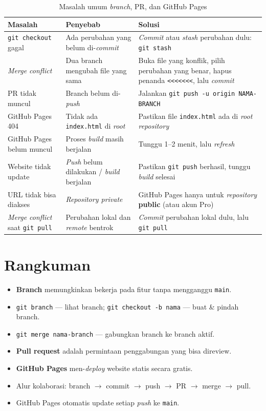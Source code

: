 \begin{table}[h!]
\centering
\caption{Masalah umum \emph{branch}, PR, dan GitHub Pages}
\label{tab:trouble-09}
\begin{tabular}{|p{3.5cm}|p{4cm}|p{5cm}|}
\hline
\textbf{Masalah} & \textbf{Penyebab} & \textbf{Solusi} \\
\hline
\texttt{git checkout} gagal & Ada perubahan yang belum di-\emph{commit} & \emph{Commit} atau \emph{stash} perubahan dulu: \texttt{git stash} \\
\hline
\emph{Merge conflict} & Dua branch mengubah file yang sama & Buka file yang konflik, pilih perubahan yang benar, hapus penanda \texttt{<<<<<<<}, lalu \emph{commit} \\
\hline
PR tidak muncul & Branch belum di-\emph{push} & Jalankan \texttt{git push -u origin NAMA-BRANCH} \\
\hline
GitHub Pages 404 & Tidak ada \texttt{index.html} di \emph{root} & Pastikan file \texttt{index.html} ada di \emph{root repository} \\
\hline
GitHub Pages belum muncul & Proses \emph{build} masih berjalan & Tunggu 1--2 menit, lalu \emph{refresh} \\
\hline
Website tidak update & \emph{Push} belum dilakukan / \emph{build} berjalan & Pastikan \texttt{git push} berhasil, tunggu \emph{build} selesai \\
\hline
URL tidak bisa diakses & \emph{Repository private} & GitHub Pages hanya untuk \emph{repository} \textbf{public} (atau akun Pro) \\
\hline
\emph{Merge conflict} saat \texttt{git pull} & Perubahan lokal dan \emph{remote} bentrok & \emph{Commit} perubahan lokal dulu, lalu \texttt{git pull} \\
\hline
\end{tabular}
\end{table}

\section{Rangkuman}
\label{sec:pr-rangkuman}

\begin{itemize}
  \item \textbf{Branch} memungkinkan bekerja pada fitur tanpa mengganggu \texttt{main}.
  \item \texttt{git branch} --- lihat branch; \texttt{git checkout -b nama} --- buat \& pindah branch.
  \item \texttt{git merge nama-branch} --- gabungkan branch ke branch aktif.
  \item \textbf{Pull request} adalah permintaan penggabungan yang bisa direview.
  \item \textbf{GitHub Pages} men-\emph{deploy} website statis secara gratis.
  \item Alur kolaborasi: branch $\rightarrow$ commit $\rightarrow$ push $\rightarrow$ PR $\rightarrow$ merge $\rightarrow$ pull.
  \item GitHub Pages otomatis update setiap \emph{push} ke \texttt{main}.
\end{itemize}
